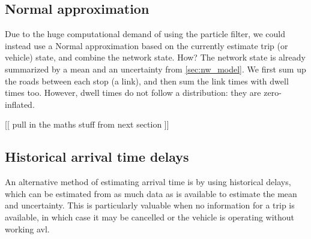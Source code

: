% 
\subsection{Normal approximation}
\label{sec:trip_travel_time_normal}

Due to the huge computational demand of using the particle filter, we could instead use a Normal approximation based on the currently estimate trip (or vehicle) state, and combine the network state. How? The network state is already summarized by a mean and an uncertainty from \cref{sec:nw_model}. We first sum up the roads between each stop (a link), and then sum the link times with dwell times too. However, dwell times do not follow a \normal{} distribution: they are zero-inflated.

[[ pull in the maths stuff from next section ]]

% 
\subsection{Historical arrival time delays}
\label{sec:trip_travel_time_historical}

An alternative method of estimating arrival time is by using historical delays, which can be estimated from as much data as is available to estimate the mean and uncertainty. This is particularly valuable when no information for a trip is available, in which case it may be cancelled or the vehicle is operating without working \gls{avl}.


% 

